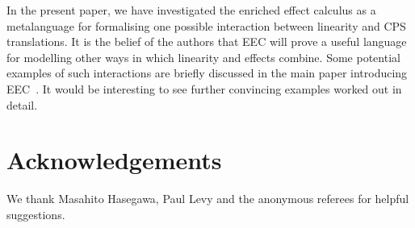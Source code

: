 \documentclass{LMCS}
\begin{document}
In the present paper, we have  investigated the enriched effect calculus  as a metalanguage for 
formalising one possible interaction between linearity and CPS translations.
It is the belief of the authors that EEC will prove
a useful language for modelling other ways in which linearity
and effects combine. Some potential examples of such interactions
are briefly discussed in the main paper introducing EEC~\cite{EMSb}. 
It would be interesting to see further convincing examples worked out
in detail.

\section*{Acknowledgements} 
We thank Masahito Hasegawa, Paul Levy and 
the anonymous referees for helpful suggestions.


\end{document}
